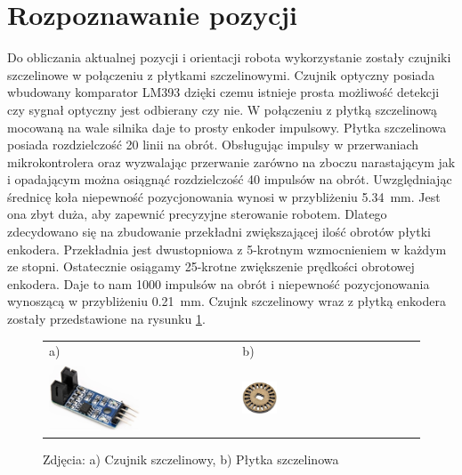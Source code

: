 	\section{Rozpoznawanie pozycji}
		Do obliczania aktualnej pozycji i orientacji robota wykorzystanie zostały czujniki szczelinowe w połączeniu z płytkami szczelinowymi. Czujnik optyczny posiada wbudowany komparator LM393 dzięki czemu istnieje prosta możliwość detekcji czy sygnał optyczny jest odbierany czy nie. W połączeniu z płytką szczelinową mocowaną na wale silnika daje to prosty enkoder impulsowy. Płytka szczelinowa posiada rozdzielczość 20 linii na obrót. Obsługując impulsy w przerwaniach mikrokontrolera oraz wyzwalając przerwanie zarówno na zboczu narastającym jak i opadającym można osiągnąć rozdzielczość 40 impulsów na obrót. Uwzględniając średnicę koła niepewność pozycjonowania wynosi w przybliżeniu \SI{5.34}{mm}. Jest ona zbyt duża, aby zapewnić precyzyjne sterowanie robotem. Dlatego zdecydowano się na zbudowanie przekładni zwiększającej ilość obrotów płytki enkodera. Przekładnia jest dwustopniowa z 5-krotnym wzmocnieniem w każdym ze stopni. Ostatecznie osiągamy 25-krotne zwiększenie prędkości obrotowej enkodera. Daje to nam 1000 impulsów na obrót i niepewność pozycjonowania wynoszącą w przybliżeniu \SI{0.21}{\milli\meter}. Czujnk szczelinowy wraz z płytką enkodera zostały przedstawione na rysunku \ref{fig:enkoderZplytka}.
		
		\begin{figure}[ht]
			\centering
			\begin{tabular}{@{}ll@{}}
				a) & b) \\
				\includegraphics[width=0.5\textwidth]{rys02/enkoder.jpg} & 
				\includegraphics[width=0.2\textwidth]{rys02/plytkaEnkodera.jpg} \\
			\end{tabular}
			\caption{Zdjęcia: a) Czujnik szczelinowy, b) Płytka szczelinowa}
			\label{fig:enkoderZplytka}
		\end{figure}
	
